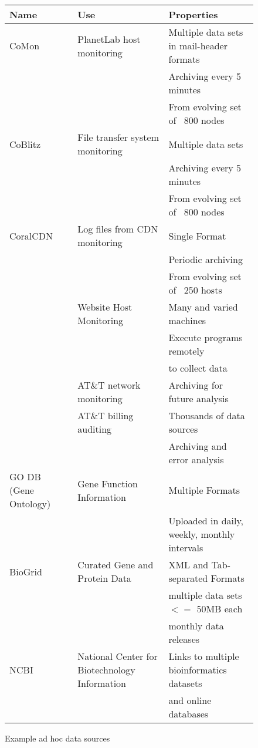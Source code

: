 \documentclass[nocopyrightspace]{sigplanconf}
\begin{document}
\begin{figure*}
\begin{center}
\begin{tabular}{|l|l|l|}
\hline\hline
Name & Use & Properties 
\\\hline\hline
CoMon~\cite{comon} & PlanetLab host monitoring & Multiple data sets in mail-header formats\\
                                       && Archiving every 5 minutes \\
                                       && From evolving set of ~800 nodes \\\hline
CoBlitz~\cite{coblitz} & File transfer system monitoring & Multiple data sets \\
                                       && Archiving every 5 minutes \\
                                       && From evolving set of ~800 nodes \\\hline
CoralCDN~\cite{coral} & Log files from CDN monitoring & Single Format \\
                                       && Periodic archiving \\
                                       && From evolving set of ~250 hosts \\\hline
\vizGems{}       & Website Host Monitoring & Many and varied machines \\
                 &                         & Execute programs remotely\\
                 &                         & to collect data\\\hline
\darkstar{}      & AT\&T network monitoring & Archiving for future analysis \\\hline
\ningaui{}       & AT\&T billing auditing   & Thousands of data sources\\
                 &                          & Archiving and error analysis\\\hline
GO DB (Gene Ontology)~\cite{geneontology} & Gene Function Information & Multiple Formats \\
                                             && Uploaded in daily, weekly, monthly intervals \\\hline
BioGrid~\cite{biogrid} & Curated Gene and Protein Data & XML and Tab-separated Formats \\
          & & multiple data sets $<=$ 50MB each \\
          & & monthly data releases \\\hline
NCBI~\cite{ncbi} & National Center for Biotechnology Information & Links to multiple bioinformatics datasets \\
                                                     && and online databases\\
\hline\hline
\end{tabular}
\end{center}
\caption{Example ad hoc data sources}
\label{fig:exampledata}
\end{figure*}
\end{document}
